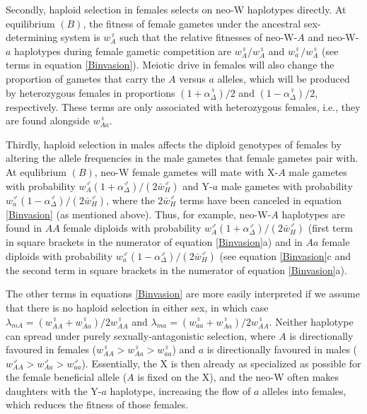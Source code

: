 \documentclass[12pt]{article}
\begin{document}
Secondly, haploid selection in females selects on neo-W haplotypes directly.
At equilibrium $(B)$, the fitness of female gametes under the ancestral sex-determining system is $w_{A}^\female$ such that the relative fitnesses of neo-W-$A$ and neo-W-$a$ haplotypes during female gametic competition are $w_{A}^\female/w_{A}^\female$ and $w_{a}^\female/w_{A}^\female$ (see terms in equation \ref{Binvasion}). 
Meiotic drive in females will also change the proportion of gametes that carry the $A$ versus $a$ alleles, which will be produced by heterozygous females in proportions $(1+\alpha_{\Delta}^\female)/2$ and $(1-\alpha_{\Delta}^\female)/2$, respectively. 
These terms are only associated with heterozygous females, i.e., they are found alongside $w_{Aa}^\female$.

Thirdly, haploid selection in males affects the diploid genotypes of females by altering the allele frequencies in the male gametes that female gametes pair with.
At equlibrium $(B)$, neo-W female gametes will mate with X-$A$ male gametes with probability $ w_A^\male (1+\alpha^\male_\Delta) / (2\bar{w}_{H}^\male)$ and Y-$a$ male gametes with probability $w_a^\male (1-\alpha^\male_\Delta) / (2\bar{w}_{H}^\male)$, where the $2\bar{w}_{H}^\male$ terms have been canceled in equation \eqref{Binvasion} (as mentioned above). 
Thus, for example, neo-W-$A$ haplotypes are found in $AA$ female diploids with probability $ w_A^\male (1+\alpha^\male_\Delta)/ (2\bar{w}_{H}^\male)$ (first term in square brackets in the numerator of equation \ref{Binvasion}a) and in $Aa$ female diploids with probability $w_a^\male (1-\alpha^\male_\Delta) / (2\bar{w}_{H}^\male)$ (see equation \ref{Binvasion}c and the second term in square brackets in the numerator of equation \ref{Binvasion}a).


The other terms in equations \eqref{Binvasion} are more easily interpreted if we assume that there is no haploid selection in either sex, in which case $\lambda_{mA}=(w_{AA}^\female+w_{Aa}^\female)/2 w_{AA}^\female$ and $\lambda_{ma}=(w_{aa}^\female+w_{Aa}^\female)/ 2 w_{AA}^\female$.
Neither haplotype can spread under purely sexually-antagonistic selection, where $A$ is directionally favoured in females ($w_{AA}^\female>w_{Aa}^\female>w_{aa}^\female$) and $a$ is directionally favoured in males ($w_{AA}^\male>w_{Aa}^\male>w_{aa}^\male$).  
Essentially, the X is then already as specialized as possible for the female beneficial allele ($A$ is fixed on the X), and the neo-W often makes daughters with the Y-$a$ haplotype, increasing the flow of $a$ alleles into females, which reduces the fitness of those females.  
\end{document}
